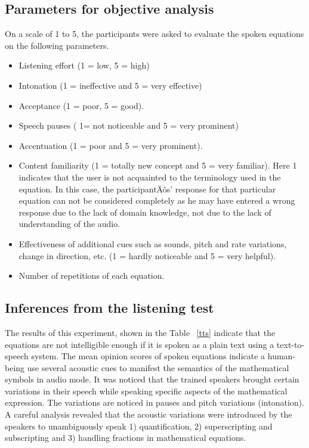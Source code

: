 \documentclass{article}
\begin{document}
\subsection{Parameters for objective analysis}
\label{ssec:parameters}

On a scale of 1 to 5, the participants were asked to evaluate the spoken equations on the following parameters.
\begin{itemize} 
 \item Listening effort (1 = low, 5 = high)
 \item Intonation (1 = ineffective and 5 = very effective)
 \item Acceptance (1 = poor, 5 = good).
 \item Speech pauses ( 1= not noticeable and 5 = very prominent)
 \item Accentuation (1 = poor and 5 = very prominent).
 \item Content familiarity (1 = totally new concept and 5 = very familiar).
 Here 1 indicates that the user is not acquainted to the terminology used in the equation. In this case, the participantÄôs' response for that particular equation can not be considered completely as he may have entered a wrong response due to the lack of domain knowledge, not due to the lack of understanding of the audio.
 \item   Effectiveness of additional cues such as sounds, pitch and rate variations, change in direction, etc. (1 = hardly noticeable and 5 = very helpful).
 \item   Number of repetitions of each equation.
\end{itemize}

\subsection{Inferences from the listening test}
\label{ssec:listening1}
The results of this experiment, shown in the Table ~\ref{tts}   indicate that the equations are not intelligible enough if it is spoken as a plain text using a text-to-speech system. The mean opinion scores of spoken equations indicate a human-being use several acoustic cues to manifest the semantics of the mathematical symbols in audio mode. It was noticed that the trained speakers brought certain variations in their speech while speaking specific aspects of the mathematical expression. The variations are noticed in pauses and pitch variations (intonation). 
A careful analysis revealed that the acoustic variations were introduced by the speakers to unambiguously speak 1) quantification, 2) superscripting and subscripting and 3) handling fractions in mathematical equations. 
\end{document}
